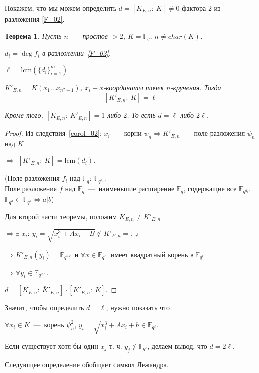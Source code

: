 \documentclass[12pt]{article}
\newcommand{\F}{{{\mathbb F}}}
\newtheorem{theorem}{Теорема}
\theoremstyle{definition}
\theoremstyle{definition}
\theoremstyle{definition}
\begin{document}
Покажем, что мы можем определить $d = [ {{K_{E,n}}:\:K} ] \ne 0$ фактора $2$ из разложения \ref{F_02}. 

\begin{theorem}
	Пусть $n$~---~простое $> 2$, $K = {\F_q}$, $n \ne char( K )$.
	
	${d_i} = \deg {f_i}$ в разложении~\eqref{F_02}.
	
	$\ell = \mathrm{lcm}( {\{ {{d_i}} \}_{i = 1}^m} )$
	
	$K'_{E,n} = K( {{x_1} \ldots {x_{{n^2} - 1}}}) $, ${x_i} - x$-координаты точек $n$-кручения. Тогда 
	$$[ {K'_{E,n}:\:K} ] = \ell
	$$
	
	Кроме того, $[ {{K_{E,n}}:\:K'_{E,n}} ] = 1$ либо $2$. То есть $d = \ell$ либо $2\ell$. 
\end{theorem}
\begin{proof}
    Из следствия~\ref{corol_02}: $x_i$~---~корни ${\psi _n} \Rightarrow K'_{E,n}$~---~поле разложения ${\psi _n}$ над $K$
    
    $ \Rightarrow $ $[ {K{'_{E,n}}:\:K} ] = \mathrm{lcm}( {{d_i}} )$.
    
    (Поле разложения $f_i$ над ${\F_q}:\:\F_{q^{d_i}}$. \\
    Поле разложения $f$ над ${\F_q}$~---~наименьшие расширение ${\F_q}$, содержащие все ${\F_{q^{d_i}}}$. \\
    $\F_{q^a} \subset {\F_{q^b}} \Leftrightarrow a | b $)
    
    Для второй части теоремы, положим ${K_{E,n}} \ne K'_{E,n}$
    
    $ \Rightarrow \exists \; {x_i}:\:{y_i} = \sqrt {x_i^3 + A{x_i} + B}  \notin K'_{E,n} = {\F_{{q^\ell}}}$
    
    $ \Rightarrow K{'_{E,n}}(y_i) = \F_{q^{2\ell}}$ и $\forall x \in \F_{q^\ell}$ $\mathop {{\text{ имеет квадратный корень в }}} \F_{q^\ell}$
    
    $ \Rightarrow \forall {y_i} \in \F_{q^{2\ell}}$.
    
    $d = [ {{K_{E,n}}:\:\bar K'_{E,n}} ] \cdot [ {K'_{E,n}:\:K} ].$
\end{proof}

Значит, чтобы определить $d = \ell$, нужно показать что 

$\forall {x_i} \in \bar K$~---~корень $\psi _n^2$, ${y_i} = \sqrt {x_i^3 + A{x_i} + b} \in  \F_{q^\ell}$. 

Если существует хотя бы один ${x_j}$ т. ч. ${y_j} \notin \F_{q^\ell}$, делаем вывод, что $d = 2\ell$.

Следующее определение обобщает символ Лежандра.
\end{document}

